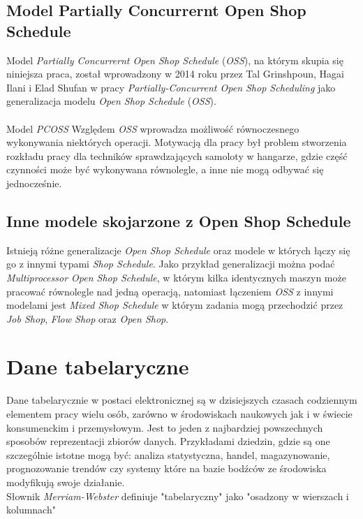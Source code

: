 \documentclass[brudnopis]{xmgr}
\begin{document}
\section{Model Partially Concurrernt Open Shop Schedule}
Model \emph{Partially Concurrernt Open Shop Schedule} (\emph{OSS}), na którym skupia się niniejsza praca, został wprowadzony w 2014 roku przez Tal Grinshpoun, Hagai Ilani i Elad Shufan w pracy \emph{Partially-Concurrent Open Shop Scheduling} \cite{PCOSS:2014:P} jako generalizacja modelu \emph{Open Shop Schedule} (\emph{OSS}). \\

\medskip\\
Model \emph{PCOSS} Względem \emph{OSS} wprowadza możliwość równoczesnego wykonywania niektórych operacji. Motywacją dla pracy był problem stworzenia rozkładu pracy dla techników sprawdzających samoloty w hangarze, gdzie część czynności może być wykonywana równolegle, a inne nie mogą odbywać się jednocześnie. 

\section{Inne modele skojarzone z Open Shop Schedule}
Istnieją różne generalizacje \emph{Open Shop Schedule} oraz modele w których łączy się go z innymi typami \emph{Shop Schedule}.
Jako przykład generalizacji można podać \emph{Multiprocessor Open Shop Schedule}, w którym kilka identycznych maszyn może pracować równolegle nad jedną operacją\cite{MPOSS:2020:X}, natomiast łączeniem \emph{OSS} z innymi modelami jest \emph{Mixed Shop Schedule} w którym zadania mogą przechodzić przez \emph{Job Shop}, \emph{Flow Shop} oraz \emph{Open Shop}.

\chapter{Dane tabelaryczne}

Dane tabelarycznie w postaci elektronicznej są w dzisiejszych czasach codziennym elementem pracy wielu osób, zarówno w środowiskach naukowych jak i w świecie konsumenckim i przemysłowym. Jest to jeden z najbardziej powszechnych sposobów reprezentacji zbiorów danych. Przykładami dziedzin, gdzie są one szczególnie istotne mogą być: analiza statystyczna, handel, magazynowanie, prognozowanie trendów czy systemy które na bazie bodźców ze środowiska modyfikują swoje działanie.
\medskip\\

Słownik \emph{Merriam-Webster} definiuje "tabelaryczny" jako "osadzony w wierszach i kolumnach" \cite{MW:TAB}
\medskip\\
\end{document}
